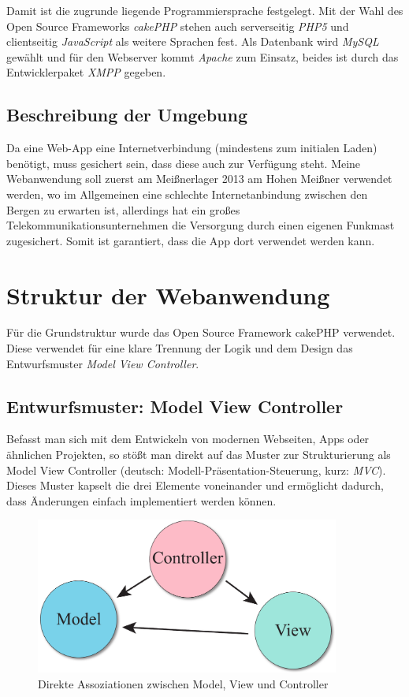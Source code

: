 Damit ist die zugrunde liegende Programmiersprache festgelegt. Mit der Wahl des Open Source Frameworks \emph{cakePHP} \cite{cakePHP} stehen auch serverseitig \emph{PHP5} und clientseitig \emph{JavaScript} als weitere Sprachen fest. Als Datenbank wird \emph{MySQL} gewählt und für den Webserver kommt \emph{Apache} zum Einsatz, beides ist durch das Entwicklerpaket \emph{XMPP} gegeben.

\subsection{Beschreibung der Umgebung}
Da eine Web-App eine Internetverbindung (mindestens zum initialen Laden) benötigt, muss gesichert sein, dass diese auch zur Verfügung steht. Meine Webanwendung soll zuerst am Meißnerlager 2013 am Hohen Meißner verwendet werden, wo im Allgemeinen eine schlechte Internetanbindung zwischen den Bergen zu erwarten ist, allerdings hat ein großes Telekommunikationsunternehmen die Versorgung durch einen eigenen Funkmast zugesichert. Somit ist garantiert, dass die App dort verwendet werden kann.

\section{Struktur der Webanwendung}
Für die Grundstruktur wurde das Open Source Framework cakePHP verwendet. Diese verwendet für eine klare Trennung der Logik und dem Design das Entwurfsmuster \emph{Model View Controller}.

\subsection{Entwurfsmuster: Model View Controller}

Befasst man sich mit dem Entwickeln von modernen Webseiten, Apps oder ähnlichen Projekten, so stößt man direkt auf das Muster zur Strukturierung als Model View Controller (deutsch: Modell-Präsentation-Steuerung, kurz: \emph{MVC}). Dieses Muster kapselt die drei Elemente voneinander und ermöglicht dadurch, dass Änderungen einfach implementiert werden können.

\begin{figure}[!ht]
	\centering
	\includegraphics[width=10cm]{fig/mvc}
	\caption{Direkte Assoziationen zwischen Model, View und Controller}
\end{figure}

